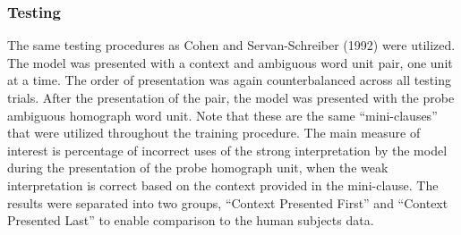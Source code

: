 \subsubsection{Testing}
The same testing procedures as Cohen and Servan-Schreiber (1992) were utilized.  The model was presented with a context and ambiguous word unit pair, one unit at a time.  The order of presentation was again counterbalanced across all testing trials.  After the presentation of the pair, the model was presented with the probe ambiguous homograph word unit.  Note that these are the same ``mini-clauses'' that were utilized throughout the training procedure. The main measure of interest is percentage of incorrect uses of the strong interpretation by the model during the presentation of the probe homograph unit, when the weak interpretation is correct based on the context provided in the mini-clause.  The results were separated into two groups, ``Context Presented First'' and ``Context Presented Last'' to enable comparison to the human subjects data.

